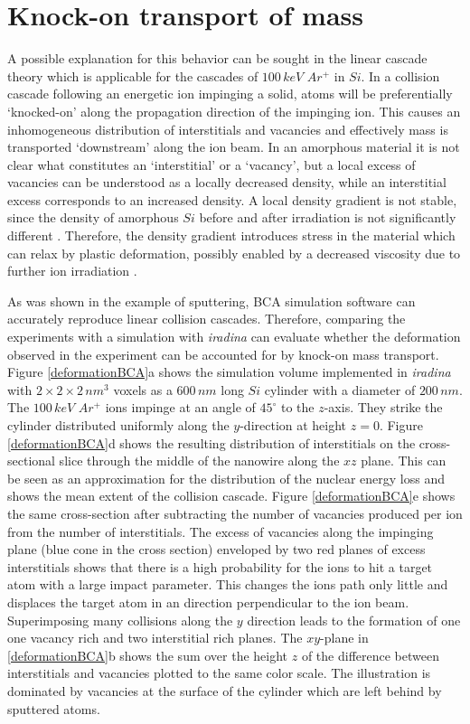 \section{Knock-on transport of mass}

A possible explanation for this behavior can be sought in the linear cascade theory which is applicable for the cascades of $100\,keV\,\,Ar^+$ in $Si$. In a collision cascade following an energetic ion impinging a solid, atoms will be preferentially `knocked-on' along the propagation direction of the impinging ion. This causes an inhomogeneous distribution of interstitials and vacancies and effectively mass is transported `downstream' along the ion beam. In an amorphous material it is not clear what constitutes an `interstitial' or a `vacancy', but a local excess of vacancies can be understood as a locally decreased density, while an interstitial excess corresponds to an increased density. A local density gradient is not stable, since the density of amorphous $Si$ before and after irradiation is not significantly different \cite{pelaz_ion-beam-induced_2004}. Therefore, the density gradient introduces stress in the material which can relax by plastic deformation, possibly enabled by a decreased viscosity due to further ion irradiation \cite{snoeks_stress_1997,hu_burrowing_2002,mayr_mechanisms_2003,mayr_effect_2003}. 

As was shown in the example of sputtering, BCA simulation software can accurately reproduce linear collision cascades. Therefore, comparing the experiments with a simulation with \emph{iradina} can evaluate whether the deformation observed in the experiment can be accounted for by knock-on mass transport. Figure \ref{deformationBCA}a shows the simulation volume implemented in \emph{iradina} with $2\times2\times2\,nm^3$ voxels as a $600\,nm$ long $Si$ cylinder with a diameter of $200\,nm$. The $100\,keV\,\,Ar^+$ ions impinge at an angle of $45^\circ$ to the $z$-axis. They strike the cylinder distributed uniformly along the $y$-direction at height $z=0$. Figure \ref{deformationBCA}d shows the resulting distribution of interstitials on the cross-sectional slice through the middle of the nanowire along the $xz$ plane. This can be seen as an approximation for the distribution of the nuclear energy loss and shows the mean extent of the collision cascade. Figure \ref{deformationBCA}e shows the same cross-section after subtracting the number of vacancies produced per ion from the number of interstitials. The excess of vacancies along the impinging plane (blue cone in the cross section) enveloped by two red planes of excess interstitials shows that there is a high probability for the ions to hit a target atom with a large impact parameter. This changes the ions path only little and displaces the target atom in an direction perpendicular to the ion beam. Superimposing many collisions along the $y$ direction leads to the formation of one one vacancy rich and two interstitial rich planes. The $xy$-plane in \ref{deformationBCA}b shows the sum over the height $z$ of the difference between interstitials and vacancies plotted to the same color scale. The illustration is dominated by vacancies at the surface of the cylinder which are left behind by sputtered atoms. 

